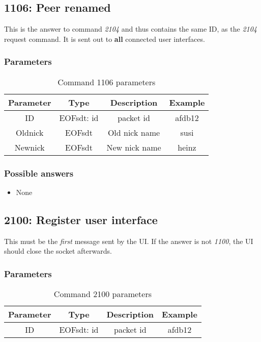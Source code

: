 \documentclass[12pt,a4paper]{book}
\begin{document}
\subsection{1106: Peer renamed}
This is the answer to command \emph{2104} and thus contains the
same ID, as the \emph{2104} request command. It is sent out to
\textbf{all} connected user interfaces.
\subsubsection{Parameters}
\begin{longtable}{|c|c|c|c|}
\caption{Command 1106 parameters}\\
\hline
\textbf{Parameter} & \textbf{Type} & \textbf{Description} & \textbf{Example}\\
\hline
ID & EOFsdt: id & packet id & afdb12\\
\hline
Oldnick & EOFsdt & Old nick name & susi\\
\hline
Newnick & EOFsdt & New nick name & heinz\\
\hline
\end{longtable}
\subsubsection{Possible answers}
\begin{itemize}
\item None
\end{itemize}
\subsection{2100: Register user interface}
This must be the \emph{first} message sent by the UI. If the answer is not
\emph{1100}, the UI should close the socket afterwards.

\subsubsection{Parameters}
\begin{longtable}{|c|c|c|c|}
\caption{Command 2100 parameters}\\
\hline
\textbf{Parameter} & \textbf{Type} & \textbf{Description} & \textbf{Example}\\
\hline
ID & EOFsdt: id & packet id & afdb12\\
\hline
\end{longtable}
\end{document}
